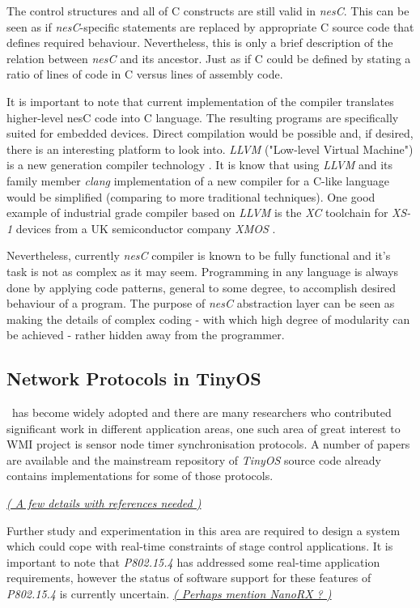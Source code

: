   The control structures and all of C constructs are still valid in
 \emph{nesC}. This can be seen as if \emph{nesC}-specific statements
 are replaced by appropriate C source code that defines required behaviour.
 Nevertheless, this is only a brief description of the relation between
 \emph{nesC} and its ancestor. Just as if C could be defined by stating
 a ratio of lines of code in C versus lines of assembly code.

 It is important to note that current implementation of the compiler
 translates higher-level nesC code into C language. The resulting
 programs are specifically suited for embedded devices. Direct
 compilation would be possible and, if desired, there is an interesting
 platform to look into. \emph{LLVM} ("Low-level Virtual Machine") is a
 new generation compiler technology \cite{links:wiki:llvm}. It is know
 that using \emph{LLVM} and its family member \emph{clang} implementation
 of a new compiler for a C-like language would be simplified (comparing
 to more traditional techniques). One good example of industrial grade
 compiler based on \emph{LLVM} is the \emph{XC} toolchain for \emph{XS-1}
 devices from a UK semiconductor company \emph{XMOS} \cite{links:xmos:tools}.

 Nevertheless, currently \emph{nesC} compiler is known to be fully
 functional and it's task is not as complex as it may seem. Programming
 in any language is always done by applying code patterns, general
 to some degree, to accomplish desired behaviour of a program.
 The purpose of \emph{nesC} abstraction layer can be seen as making
 the details of complex coding - with which high degree of modularity
 can be achieved - rather hidden away from the programmer.


\subsection{Network Protocols in TinyOS}
 
  \TinyOS\ has become widely adopted and there are many researchers
 who contributed significant work in different application areas, one
 such area of great interest to WMI project is sensor node timer
 synchronisation protocols. A number of papers are available and the
 mainstream repository of \emph{TinyOS} source code already contains
 implementations for some of those protocols.

 \underline{\emph{( A few details with references needed )}}

  Further study and experimentation in this area are required to design
 a system which could cope with real-time constraints of stage control
 applications. It is important to note that \emph{P802.15.4} has addressed
 some real-time application requirements, however the status of software
 support for these features of \emph{P802.15.4} is currently uncertain.
 \underline{\emph{( Perhaps mention NanoRX ? )}}

